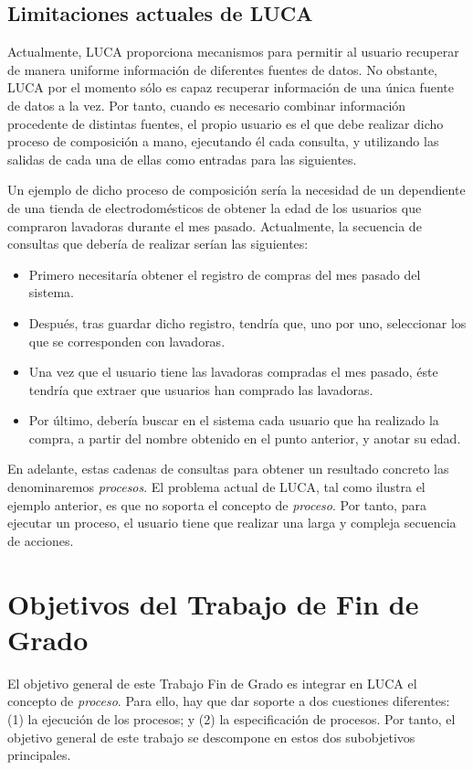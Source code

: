 \subsection{Limitaciones actuales de LUCA}

Actualmente, LUCA proporciona mecanismos para permitir al usuario recuperar de manera uniforme información de diferentes fuentes de datos. No obstante, LUCA por el momento sólo es capaz recuperar información de una única fuente de datos a la vez. Por tanto, cuando es necesario combinar información procedente de distintas fuentes, el propio usuario es el que debe realizar dicho proceso de composición a mano, ejecutando él cada consulta, y utilizando las salidas de cada una de ellas como entradas para las siguientes.


Un ejemplo de dicho proceso de composición sería la necesidad de un dependiente de una tienda de electrodomésticos de obtener la edad de los usuarios que compraron lavadoras durante el mes pasado. Actualmente, la secuencia de consultas que debería de realizar serían las siguientes:

\begin{itemize}
	\item Primero necesitaría obtener el registro de compras del mes pasado del sistema.
	\item Después, tras guardar dicho registro, tendría que, uno por uno, seleccionar los que se corresponden con lavadoras.
	\item Una vez que el usuario tiene las lavadoras compradas el mes pasado, éste tendría que extraer que usuarios han comprado las lavadoras.
	\item Por último, debería buscar en el sistema cada usuario que ha realizado la compra, a partir del nombre obtenido en el punto anterior, y anotar su edad.
\end{itemize}

En adelante, estas cadenas de consultas para obtener un resultado concreto las denominaremos \emph{procesos}. El problema actual de LUCA, tal como ilustra el ejemplo anterior, es que no soporta el concepto de \emph{proceso}. Por tanto, para ejecutar un proceso,  el usuario tiene que realizar una larga y compleja secuencia de acciones.

\section{Objetivos del Trabajo de Fin de Grado}

El objetivo general de este Trabajo Fin de Grado es integrar en LUCA el concepto de \emph{proceso}. Para ello, hay que dar soporte a dos cuestiones diferentes: (1) la ejecución de los procesos; y (2) la especificación de procesos. Por tanto, el objetivo general de este trabajo se descompone en estos dos subobjetivos principales.

